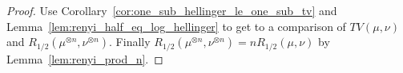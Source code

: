 \begin{proof}
Use Corollary~\ref{cor:one_sub_hellinger_le_one_sub_tv} and Lemma~\ref{lem:renyi_half_eq_log_hellinger} to get to a comparison of $TV(\mu, \nu)$ and $R_{1/2}(\mu^{\otimes n}, \nu^{\otimes n})$. Finally $R_{1/2}(\mu^{\otimes n}, \nu^{\otimes n}) = n R_{1/2}(\mu, \nu)$ by Lemma~\ref{lem:renyi_prod_n}.
\end{proof}
